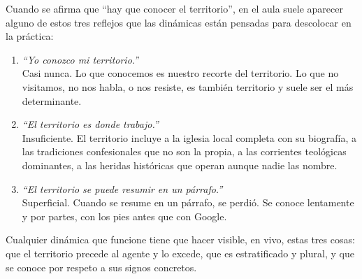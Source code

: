 \documentclass[11pt, a4paper]{article}
\begin{document}
Cuando se afirma que ``hay que conocer el territorio'', en el aula suele aparecer alguno de estos tres reflejos que las dinámicas están pensadas para descolocar en la práctica:

\begin{enumerate}[label={\color{territorioTierra}\arabic*.}]
  \item \emph{``Yo conozco mi territorio.''} \\
        Casi nunca. Lo que conocemos es nuestro recorte del territorio. Lo que no visitamos, no nos habla, o nos resiste, es también territorio y suele ser el más determinante.
  \item \emph{``El territorio es donde trabajo.''} \\
        Insuficiente. El territorio incluye a la iglesia local completa con su biografía, a las tradiciones confesionales que no son la propia, a las corrientes teológicas dominantes, a las heridas históricas que operan aunque nadie las nombre.
  \item \emph{``El territorio se puede resumir en un párrafo.''} \\
        Superficial. Cuando se resume en un párrafo, se perdió. Se conoce lentamente y por partes, con los pies antes que con Google.
\end{enumerate}

Cualquier dinámica que funcione tiene que hacer visible, en vivo, estas tres cosas: que el territorio precede al agente y lo excede, que es estratificado y plural, y que se conoce por respeto a sus signos concretos.

\vspace{1.5em}
\end{document}
